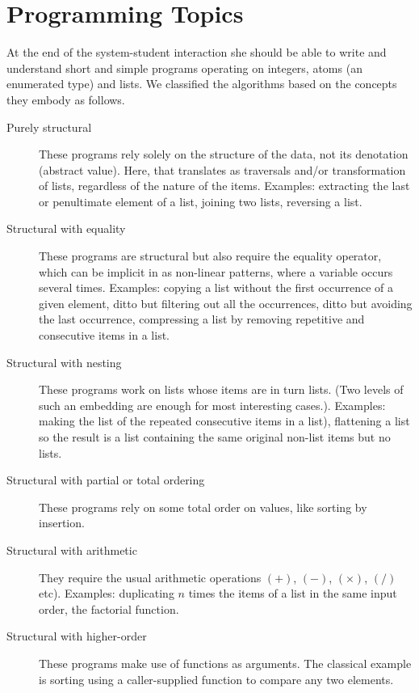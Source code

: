 
\section{Programming Topics}

At the end of the system\hyp{}student interaction she should be able
to write and understand short and simple \Erlang programs operating on
integers, atoms (an enumerated type) and lists. We classified the
algorithms based on the concepts they embody as follows.

\begin{description}

  \item[Purely structural] These programs rely solely on the structure
    of the data, not its denotation (abstract value). Here, that
    translates as traversals and/or transformation of lists,
    regardless of the nature of the items. Examples: extracting the
    last or penultimate element of a list, joining two lists,
    reversing a list.

  \item[Structural with equality] These programs are structural but
    also require the equality operator, which can be implicit in
    \Erlang as non\hyp{}linear patterns, where a variable occurs
    several times. Examples: copying a list without the first
    occurrence of a given element, ditto but filtering out all the
    occurrences, ditto but avoiding the last occurrence, compressing a
    list by removing repetitive and consecutive items in a list.

  \item [Structural with nesting] These programs work on lists whose
    items are in turn lists. (Two levels of such an embedding are
    enough for most interesting cases.). Examples: making the list of
    the repeated consecutive items in a list), flattening a list so
    the result is a list containing the same original non\hyp{}list
    items but no lists.

  \item[Structural with partial or total ordering] These programs rely
    on some total order on values, like sorting by insertion.

  \item [Structural with arithmetic] They require the usual
    arithmetic operations \((+)\), \((-)\), \((\times)\), \((/)\)
    etc). Examples: duplicating \(n\) times the items of a list in the
    same input order, the factorial function.

  \item [Structural with higher\hyp{}order] These programs make use of
    functions as arguments. The classical example is sorting using a
    caller\hyp{}supplied function to compare any two elements.

\end{description}
